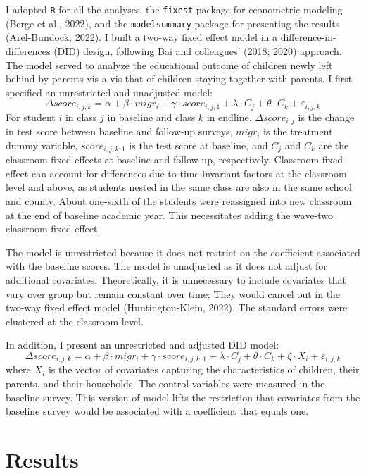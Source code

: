 \documentclass[
  man,floatsintext]{apa7}
\begin{document}
I adopted \texttt{R} for all the analyses, the \texttt{fixest} package for econometric modeling (Berge et al., 2022), and the \texttt{modelsummary} package for presenting the results (Arel-Bundock, 2022). I built a two-way fixed effect model in a difference-in-differences (DID) design, following Bai and colleagues' (2018; 2020) approach. The model served to analyze the educational outcome of children newly left behind by parents vis-a-vis that of children staying together with parents. I first specified an unrestricted and unadjusted model: \[\Delta score_{i,j,k} = \alpha + \beta \cdot migr_{i} + \gamma \cdot score_{i,j;1} + \lambda \cdot C_{j} + \theta \cdot C_{k} + \varepsilon_{i,j,k}\] For student \(i\) in class \(j\) in baseline and class \(k\) in endline, \(\Delta score_{i,j}\) is the change in test score between baseline and follow-up surveys, \(migr_{i}\) is the treatment dummy variable, \(score_{i,j,k;1}\) is the test score at baseline, and \(C_{j}\) and \(C_{k}\) are the classroom fixed-effects at baseline and follow-up, respectively. Classroom fixed-effect can account for differences due to time-invariant factors at the classroom level and above, as students nested in the same class are also in the same school and county. About one-sixth of the students were reassigned into new classroom at the end of baseline academic year. This necessitates adding the wave-two classroom fixed-effect.

The model is unrestricted because it does not restrict on the coefficient associated with the baseline scores. The model is unadjusted as it does not adjust for additional covariates. Theoretically, it is unnecessary to include covariates that vary over group but remain constant over time; They would cancel out in the two-way fixed effect model (Huntington-Klein, 2022). The standard errors were clustered at the classroom level.

In addition, I present an unrestricted and adjusted DID model: \[\Delta score_{i,j,k} = \alpha + \beta \cdot migr_{i} + \gamma \cdot score_{i,j,k;1} + \lambda \cdot C_{j} + \theta \cdot C_{k} + \zeta \cdot X_{i} + \varepsilon_{i,j,k}\] where \(X_{i}\) is the vector of covariates capturing the characteristics of children, their parents, and their households. The control variables were measured in the baseline survey. This version of model lifts the restriction that covariates from the baseline survey would be associated with a coefficient that equals one.

\newpage

\hypertarget{results}{%
\section{Results}\label{results}}
\end{document}
